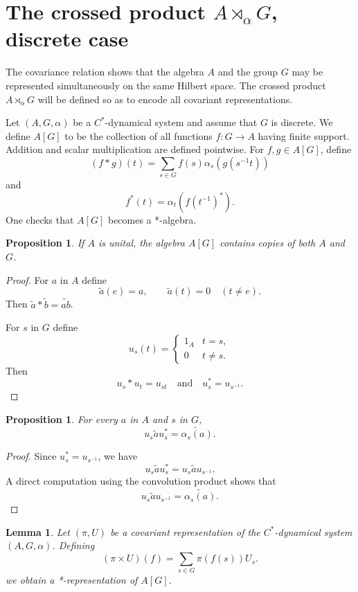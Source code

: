 \documentclass{book}
\newtheorem{lemma}[definition]{Lemma}
\newtheorem{proposition}[definition]{Proposition}
\begin{document}
\section{The crossed product \texorpdfstring{\(A\rtimes_\alpha G\)}{Ax alpha G}, discrete case}
The covariance relation shows that the algebra \(A\) and
the group \(G\) may be represented simultaneously on the
same Hilbert space.
The crossed product \(A\rtimes_\alpha G\) will be defined
so as to encode all covariant representations.\par
Let \((A,G,\alpha)\) be a \(C^*\)-dynamical system and assume
that \(G\) is discrete.
We define \(A[G]\) to be the collection of all functions
\(f:G\to A\) having finite support.
Addition and scalar multiplication are defined pointwise.
For \(f,g\in A[G]\), define
\[(f*g)(t)
=
\sum_{s\in G}
f(s)\alpha_s(g(s^{-1}t))\]
and
\[f^*(t)
=
\alpha_t(f{(t^{-1})}^*).
\]
One checks that \(A[G]\) becomes a *-algebra.
\begin{proposition}
  If \(A\) is unital, the algebra \(A[G]\) contains copies of both \(A\) and \(G\).
\end{proposition}
\begin{proof}
  For \(a\) in \(A\) define
  \[
  \tilde a(e)=a,
  \qquad
  \tilde a(t)=0
  \quad(t\neq e).
  \]
  Then
  \(\tilde a*\tilde b=\widetilde{ab}\).\par
  For \(s\) in \(G\) define
  \[
  u_s(t)
  =
  \begin{cases}
  1_A & t=s,\\
  0 & t\neq s.
  \end{cases}
  \]
  Then
  \[u_s*u_t=u_{st}
  \quad\text{and}\quad
  u_s^*=u_{s^{-1}}.\]
\end{proof}
\begin{proposition}
  For every \(a\) in \(A\) and \(s\) in \(G\),
  \[u_s\tilde a u_s^*
  =
  \widetilde{\alpha_s(a)}.\]
\end{proposition}
\begin{proof}
  Since
  \(u_s^*=u_{s^{-1}}\), we have
  \[
  u_s\tilde a u_s^*
  =
  u_s\tilde a u_{s^{-1}}.
  \]
  A direct computation using the convolution product shows that
  \[
  u_s\tilde a u_{s^{-1}}
  =
  \widetilde{\alpha_s(a)}.\]
\end{proof}
\begin{lemma}
  Let \((\pi,U)\) be a covariant representation of the \(C^*\)-dynamical system \((A,G,\alpha)\). Defining \[(\pi\times U)(f)
  =
  \sum_{s\in G}
  \pi(f(s))U_s.\] 
  we obtain a *-representation of \(A[G]\). 
\end{lemma}
\end{document}
